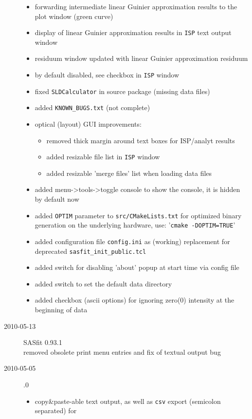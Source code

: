 \begin{description}
\begin{itemize}
        \item forwarding intermediate linear Guinier approximation results to the plot window (green curve)
        \item display of linear Guinier approximation results in \texttt{ISP} text output window
        \item residuum window updated with linear Guinier approximation residuum
        \item by default disabled, see checkbox in \texttt{ISP} window
        \item fixed \texttt{SLDCalculator} in source package (missing data files)
        \item added \texttt{KNOWN\_BUGS.txt} (not complete)
        \item optical (layout) GUI improvements:
            \begin{itemize}
            \item removed thick margin around text boxes for ISP/analyt results
            \item added resizable file list in \texttt{ISP} window
            \item added resizable 'merge files' list when loading data files
            \end{itemize}
        \item added menu->tools->toggle console to show the console, it is hidden by default now
        \item added \texttt{OPTIM} parameter to \texttt{src/CMakeLists.txt} for optimized binary generation on the underlying hardware, use: '\texttt{cmake -DOPTIM=TRUE}'
        \item added configuration file \texttt{config.ini} as (working) replacement for deprecated \texttt{sasfit\_init\_public.tcl}
        \item added switch for disabling 'about' popup at start time via config file
        \item added switch to set the default data directory
        \item added checkbox (ascii options) for ignoring zero(0) intensity at the beginning of data
        \end{itemize}
    \item[2010-05-13] SASfit 0.93.1 \\
    removed obsolete print menu entries and fix of textual output bug
    \item[2010-05-05] .0
        \begin{itemize}
            \item copy\&paste-able text output, as well as \texttt{csv} export (semicolon separated) for

\end{itemize}
\end{description}

